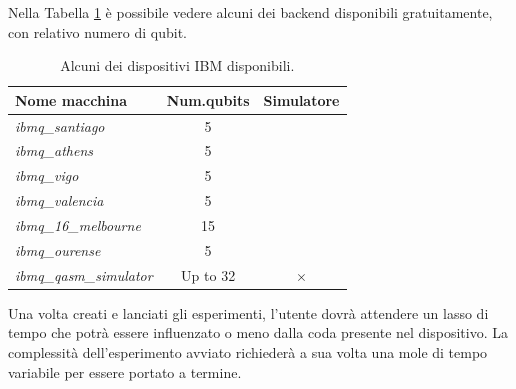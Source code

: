 Nella Tabella \ref{table:dispositivi_quantistici} è possibile vedere alcuni dei backend disponibili gratuitamente, con relativo numero di qubit.
\begin{table}[h]
\centering
\begin{tabular}{l|c|c}
    \hline\hline
    \textbf{Nome macchina} &  \textbf{Num.qubits} & \textbf{Simulatore}\\
    \hline
    \textit{ibmq\_santiago} & 5 &  \\
    \textit{ibmq\_athens} & 5 &  \\
    \textit{ibmq\_vigo} & 5 &  \\
    \textit{ibmq\_valencia} & 5 &  \\
    \textit{ibmq\_16\_melbourne} & 15 &  \\
    \textit{ibmq\_ourense} & 5 &  \\
    \textit{ibmq\_qasm\_simulator} & {Up to 32} & $\times$\\
    \hline\hline
\end{tabular}
\caption{Alcuni dei dispositivi IBM disponibili.}
\label{table:dispositivi_quantistici}
\end{table}
\newline\newline

Una volta creati e lanciati gli esperimenti, l'utente dovrà attendere un lasso di tempo che potrà essere influenzato o meno dalla coda presente nel dispositivo.
La complessità dell'esperimento avviato richiederà a sua volta una mole di tempo variabile per essere portato a termine.

